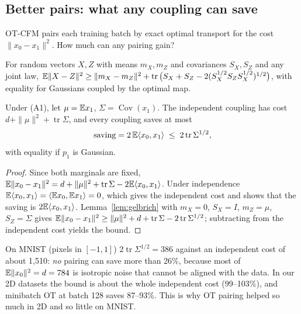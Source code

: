 \subsection{Better pairs: what any coupling can save}\label{sec:pairs}
OT-CFM \citep{tong2024otcfm} pairs each training batch by exact optimal transport for the cost $\|x_0-x_1\|^2$. How much can any pairing gain?
\begin{lemma}\label{lem:gelbrich}
For random vectors $X,Z$ with means $m_X,m_Z$ and covariances $S_X,S_Z$ and any joint law,
$\mathbb{E}\|X-Z\|^2\ge\|m_X-m_Z\|^2+\operatorname{tr}\big(S_X+S_Z-2(S_X^{1/2}S_ZS_X^{1/2})^{1/2}\big)$, with equality for Gaussians coupled by the optimal map.
\end{lemma}
\begin{proposition}\label{prop:bound}
Under (A1), let $\mu=\mathbb{E} x_1$, $\Sigma=\operatorname{Cov}(x_1)$. The independent coupling has cost $d+\|\mu\|^2+\operatorname{tr}\Sigma$, and every coupling saves at most
\begin{equation}\label{eq:bound}
\text{saving}=2\,\mathbb{E}\langle x_0,x_1\rangle\;\le\;2\operatorname{tr}\Sigma^{1/2},
\end{equation}
with equality if $p_1$ is Gaussian.
\end{proposition}
\begin{proof}
Since both marginals are fixed, $\mathbb{E}\|x_0-x_1\|^2=d+\|\mu\|^2+\operatorname{tr}\Sigma-2\mathbb{E}\langle x_0,x_1\rangle$. Under independence $\mathbb{E}\langle x_0,x_1\rangle=\langle\mathbb{E} x_0,\mathbb{E} x_1\rangle=0$, which gives the independent cost and shows that the saving is $2\mathbb{E}\langle x_0,x_1\rangle$. Lemma~\ref{lem:gelbrich} with $m_X=0$, $S_X=I$, $m_Z=\mu$, $S_Z=\Sigma$ gives $\mathbb{E}\|x_0-x_1\|^2\ge\|\mu\|^2+d+\operatorname{tr}\Sigma-2\operatorname{tr}\Sigma^{1/2}$; subtracting from the independent cost yields the bound.
\end{proof}
On MNIST (pixels in $[-1,1]$) $2\operatorname{tr}\Sigma^{1/2}=386$ against an independent cost of about 1,510: \emph{no} pairing can save more than 26\%, because most of $\mathbb{E}\|x_0\|^2=d=784$ is isotropic noise that cannot be aligned with the data. In our 2D datasets the bound is about the whole independent cost (99--103\%), and minibatch OT at batch 128 saves 87--93\%. This is why OT pairing helped so much in 2D and so little on MNIST. %

